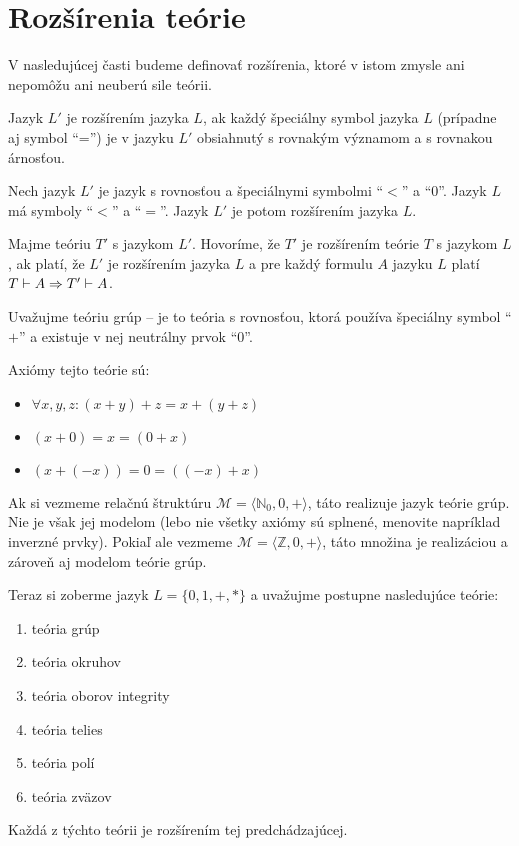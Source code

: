 \section{Rozšírenia teórie}

V nasledujúcej časti budeme definovať rozšírenia,
ktoré v istom zmysle ani nepomôžu ani
neuberú sile teórii.

\begin{definicia}
    Jazyk $L'$ je rozšírením jazyka $L$, ak každý
    špeciálny symbol jazyka $L$ (prípadne aj symbol ``='')
    je v jazyku $L'$ obsiahnutý s rovnakým významom a s rovnakou árnosťou.
\end{definicia}

\begin{priklad}
    Nech jazyk $L'$ je jazyk s rovnosťou a špeciálnymi symbolmi
    ``$<$'' a ``$0$''.
    Jazyk $L$ má symboly ``$<$'' a ``$=$''.
    Jazyk $L'$ je potom rozšírením jazyka $L$.
\end{priklad}    

\begin{definicia}
    Majme teóriu $T'$ s jazykom $L'$. Hovoríme, že $T'$ je
    rozšírením teórie $T$ s jazykom $L$, ak platí,
    že $L'$ je rozšírením jazyka $L$ a pre každý formulu $A$ jazyku $L$
    platí $T \vdash A \Rightarrow T' \vdash A$. 
\end{definicia}

\begin{priklad}
    Uvažujme teóriu grúp -- je to teória s rovnosťou, ktorá
    používa špeciálny symbol ``$+$'' a existuje v nej neutrálny prvok
    ``0''.
    
    Axiómy tejto teórie sú:
    \begin{itemize}
    \item $\forall x,y,z: (x+y)+z = x+(y+z)$
    \item $(x+0) = x = (0+x)$
    \item $(x+(-x)) = 0 = ((-x)+x)$
    \end{itemize}

    Ak si vezmeme relačnú štruktúru 
    $\mathcal{M}=\langle \mathbb{N}_0,0,+ \rangle$,
    táto realizuje jazyk teórie grúp.
    Nie je však jej modelom (lebo nie všetky axiómy sú splnené, menovite
    napríklad inverzné prvky).
    Pokiaľ ale vezmeme $\mathcal{M}=\langle \mathbb{Z},0,+ \rangle$,
    táto množina je realizáciou a zároveň aj modelom teórie grúp.  

    Teraz si zoberme jazyk $L = \{0,1,+,*\}$
    a uvažujme postupne nasledujúce teórie:
    \begin{enumerate}
    \item teória grúp
    \item teória okruhov
    \item teória oborov integrity
    \item teória telies
    \item teória polí
    \item teória zväzov
    \end{enumerate}
    Každá z týchto teórii je rozšírením tej predchádzajúcej.
\end{priklad}

